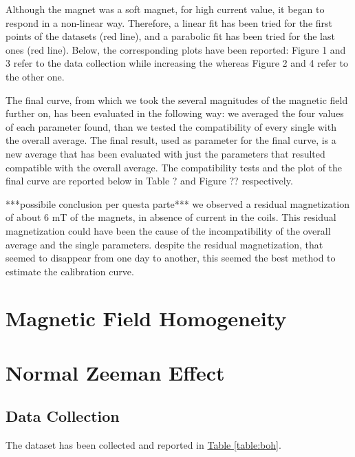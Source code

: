 \documentclass[a4paper,12pt,abstracton]{scrartcl}
\begin{document}


Although the magnet was a soft magnet, for high current value, it began to respond in a non-linear way. Therefore, a linear fit has been tried for the first points of the datasets (red line), and a parabolic fit has been tried for the last ones (red line). Below, the corresponding plots have been reported: Figure 1 and 3 refer to the data collection while increasing the whereas Figure 2 and 4 refer to the other one.


The final curve, from which we took the several magnitudes of the magnetic field further on, has been evaluated in the following way: we averaged the four values of each parameter found, than we tested the compatibility of every single with the overall average. The final result, used as parameter for the final curve, is a new average that has been evaluated with just the parameters that resulted compatible with the overall average. The compatibility tests and the plot of the final curve are reported below in Table ? and Figure ?? respectively.


***possibile conclusion per questa parte***
we observed a residual magnetization of about 6 mT of the magnets, in absence of current in the coils. This residual magnetization could have been the cause of the incompatibility of the overall average and the single parameters. despite the residual magnetization, that seemed to disappear from one day to another, this seemed the best method to estimate the calibration curve.


\section{Magnetic Field Homogeneity}


\section{Normal Zeeman Effect}

\subsection{Data Collection}
The dataset has been collected and reported in \hyperref[table:boh]{Table \ref*{table:boh}}. \newline 
\end{document}

